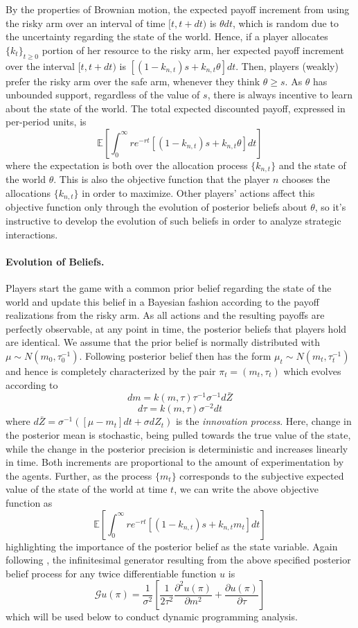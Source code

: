By the properties of Brownian motion, the expected payoff increment from using the risky arm over an interval of time $[t,t+dt)$ is $\theta dt$, which is random due to the uncertainty regarding the state of the world. Hence, if a player allocates $\{k_{t}\}_{t\geq 0}$ portion of her resource to the risky arm, her expected payoff increment over the interval $[t,t+dt)$ is $[(1-k_{n,t})s + k_{n,t}\theta]dt$. Then, players (weakly) prefer the risky arm over the safe arm, whenever they think $\theta \geq s$. As $\theta$ has unbounded support, regardless of the value of $s$, there is always incentive to learn about the state of the world. The total expected discounted payoff, expressed in per-period units, is
\[\mathbb{E} \left[ \int_{0}^{\infty} re^{-rt} [(1-k_{n,t})s + k_{n,t}\theta] dt \right] \]
where the expectation is both over the allocation process $\{k_{n,t}\}$ and the state of the world $\theta$. This is also the objective function that the player $n$ chooses the allocations $\{k_{n,t}\}$ in order to maximize. Other players' actions affect this objective function only through the evolution of posterior beliefs about $\theta$, so it's instructive to develop the evolution of such beliefs in order to analyze strategic interactions.

\paragraph{Evolution of Beliefs.} Players start the game with a common prior belief regarding the state of the world and update this belief in a Bayesian fashion according to the payoff realizations from the risky arm. As all actions and the resulting payoffs are perfectly observable, at any point in time, the posterior beliefs that players hold are identical. We assume that the prior belief is normally distributed with $\mu \sim N(m_0, \tau_0^{-1})$. Following \cite{keller2020undiscounted} posterior belief then has the form $\mu_t \sim  N(m_t, \tau_t^{-1})$ and hence is completely characterized by the pair $\pi_t = (m_t,\tau_t)$ which evolves according to
\[ dm = k(m,\tau)\tau^{-1}\sigma^{-1}d\bar{Z} \]
\[d\tau = k(m,\tau)\sigma^{-2}dt\]
where $d\bar{Z} = \sigma^{-1}([\mu - m_t]dt + \sigma dZ_t)$ is the \textit{innovation process}. Here, change in the posterior mean is stochastic, being pulled towards the true value of the state, while the change in the posterior precision is deterministic and increases linearly in time. Both increments are proportional to the amount of experimentation by the agents.  Further, as the process $\{m_t\}$ corresponds to the subjective expected value of the state of the world at time $t$, we can write the above objective function as
\[\mathbb{E} \left[ \int_{0}^{\infty} re^{-rt} [(1-k_{n,t})s + k_{n,t} m_t] dt \right] \]
highlighting the importance of the posterior belief as the state variable. Again following \cite{keller2020undiscounted}, the infinitesimal generator resulting from the above specified posterior belief process for any twice differentiable function $u$ is
\[ \mathcal{G}u(\pi) = \frac{1}{\sigma^2} \left[\frac{1}{2\tau^2} \frac{\partial ^2u(\pi)}{\partial m^2} + \frac{\partial u(\pi)}{\partial \tau} \right] \]
which will be used below to conduct dynamic programming analysis. 

